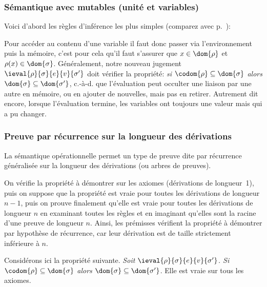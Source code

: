 %
\begin{frame}
\frametitle{Sémantique avec mutables (unité et variables)}

\label{invariant_ref}

Voici d'abord les règles d'inférence les plus simples (comparez
 avec
p.~\pageref{semantique_operationnelle_etendue_lisible}):
Pour accéder au contenu d'une variable il faut donc passer via
l'environnement puis la mémoire, c'est pour cela qu'il faut s'assurer
que $x \in \dom{\rho}$ et $\rho(x) \in \dom{\sigma}$.  Généralement,
notre nouveau jugement $\ieval{\rho}{\sigma}{e}{v}{\sigma'}$ doit
vérifier la propriété: \emph{si $\codom{\rho} \subseteq
\dom{\sigma}$ alors $\dom{\sigma} \subseteq \dom{\sigma'}$},
c.-à-d. que l'évaluation peut occulter une liaison par une autre en
mémoire, ou en ajouter de nouvelles, mais pas en retirer. Autrement
dit encore, lorsque l'évaluation termine, les variables ont toujours
une valeur mais qui a pu changer.

\end{frame}

%
\begin{frame}
\frametitle{Preuve par récurrence sur la longueur des dérivations}

La sémantique opérationnelle permet un type de preuve dite par
récurrence généralisée sur la longueur des dérivations (ou arbres de
preuves).

\bigskip

On vérifie la propriété à démontrer sur les axiomes (dérivations de
longueur~1), puis on suppose que la propriété est vraie pour toutes
les dérivations de longueur $n-1$, puis on prouve finalement qu'elle
est vraie pour toutes les dérivations de longueur $n$ en examinant
toutes les règles et en imaginant qu'elles sont la racine d'une preuve
de longueur $n$. Ainsi, les prémisses vérifient la propriété à
démontrer par hypothèse de récurrence, car leur dérivation est de
taille strictement inférieure à $n$.

\bigskip

Considérons ici la propriété suivante. \emph{Soit
$\ieval{\rho}{\sigma}{e}{v}{\sigma'}$. Si $\codom{\rho} \subseteq
\dom{\sigma}$ alors $\dom{\sigma} \subseteq \dom{\sigma'}$}. Elle est
vraie sur tous les axiomes.

\end{frame}

